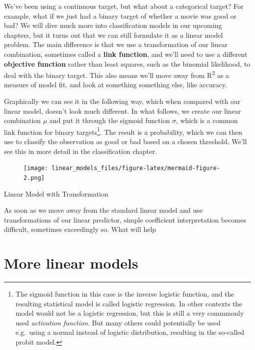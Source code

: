 \documentclass[
  letterpaper,
]{krantz}
\begin{document}
We've been using a continuous target, but what about a categorical
target? For example, what if we just had a binary target of whether a
movie was good or bad? We will dive much more into classification models
in our upcoming chapters, but it turns out that we can still formulate
it as a linear model problem. The main difference is that we use a
transformation of our linear combination, sometimes called a
\textbf{link function}, and we'll need to use a different
\textbf{objective function} rather than least squares, such as the
binomial likelihood, to deal with the binary target. This also means
we'll move away from R\textsuperscript{2} as a measure of model fit, and
look at something something else, like accuracy.

Graphically we can see it in the following way, which when compared with
our linear model, doesn't look much different. In what follows, we
create our linear combination \(\mu\) and put it through the sigmoid
function \(\sigma\), which is a common link function for binary
targets\footnote{The sigmoid function in this case is the inverse
  logistic function, and the resulting statistical model is called
  logistic regression. In other contexts the model would not be a
  logistic regression, but this is still a very commmonly used
  \emph{activation function}. But many others could potentially be used
  e.g.~using a normal instead of logistic distribution, resulting in the
  so-called probit model.}. The result is a probability, which we can
then use to classify the observation as good or bad based on a chosen
threshold. We'll see this in more detail in the classification chapter.

\begin{figure}[H]

{\centering \texttt{[image: linear\_models\_files/figure-latex/mermaid-figure-2.png]}

}

\end{figure}

Linear Model with Transformation

As soon as we move away from the standard linear model and use
transformations of our linear predictor, simple coefficient
interpretation becomes difficult, sometimes exceedingly so. What will
help

\section{More linear models}\label{more-linear-models}
\end{document}
